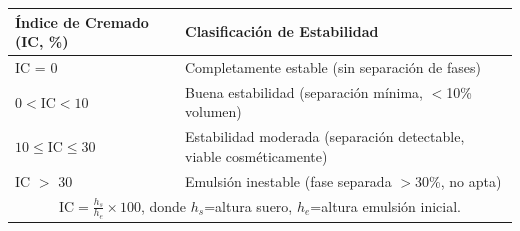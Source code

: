 \documentclass{article}
\begin{document}
\large

\begin{table}[h!]
\centering
\begin{tabular}{p{2.5cm} p{7.5cm}}
\toprule
\textbf{Índice de Cremado (IC, \%)} & \textbf{Clasificación de Estabilidad} \\
\midrule
IC = 0 & Completamente estable (sin separación de fases) \\
$0 < \text{IC} < 10$ & Buena estabilidad (separación mínima, $<$10\% volumen) \\
$10 \leq \text{IC} \leq 30$ & Estabilidad moderada (separación detectable, viable cosméticamente) \\
IC $>$ 30 & Emulsión inestable (fase separada $>$30\%, no apta) \\
\bottomrule
\multicolumn{2}{c}{\footnotesize $\text{IC} = \frac{h_s}{h_e} \times 100$, donde $h_s$=altura suero, $h_e$=altura emulsión inicial.} \\
\end{tabular}
\end{table}
\end{document}
